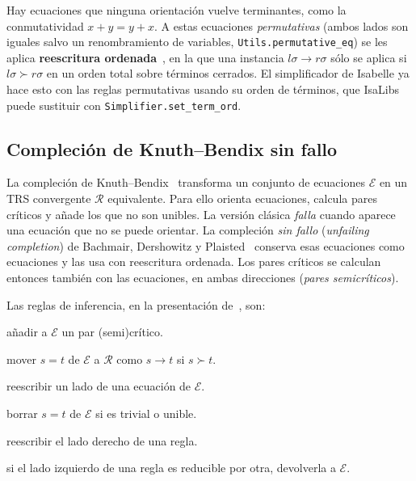 \documentclass[11pt,a4paper]{article}
\newcommand{\isa}[1]{\texttt{#1}}
\newcommand{\R}{\mathcal{R}}
\newcommand{\E}{\mathcal{E}}
\newcommand{\rw}{\rightarrow}
\theoremstyle{definition}
\theoremstyle{remark}
\begin{document}
Hay ecuaciones que ninguna orientación vuelve terminantes, como la conmutatividad
$x + y = y + x$. A estas ecuaciones \emph{permutativas} (ambos lados son iguales
salvo un renombramiento de variables, \isa{Utils.permutative\_eq}) se les aplica
\textbf{reescritura ordenada}~\cite{martin-nipkow}, en la que una instancia
$l\sigma \rw r\sigma$ sólo se aplica si $l\sigma \succ r\sigma$ en un orden total sobre términos cerrados.
El simplificador de Isabelle ya hace esto con las reglas permutativas usando su orden
de términos, que IsaLibs puede sustituir con \isa{Simplifier.set\_term\_ord}.

\subsection{Compleción de Knuth--Bendix sin fallo}
\label{sec:kb}

La compleción de Knuth--Bendix~\cite{knuth-bendix} transforma un conjunto de
ecuaciones $\E$ en un TRS convergente $\R$ equivalente. Para ello orienta ecuaciones,
calcula pares críticos y añade los que no son unibles. La versión clásica
\emph{falla} cuando aparece una ecuación que no se puede orientar. La compleción
\emph{sin fallo} (\emph{unfailing completion}) de Bachmair, Dershowitz y
Plaisted~\cite{bdp} conserva esas ecuaciones como ecuaciones y las usa con
reescritura ordenada. Los pares críticos se calculan entonces también con las
ecuaciones, en ambas direcciones (\emph{pares semicríticos}).

Las reglas de inferencia, en la presentación de~\cite{baader-nipkow}, son:
\begin{description}[nosep,font=\normalfont\itshape]
  \item[Deducir] añadir a $\E$ un par (semi)crítico.
  \item[Orientar] mover $s = t$ de $\E$ a $\R$ como $s \rw t$ si $s \succ t$.
  \item[Simplificar] reescribir un lado de una ecuación de $\E$.
  \item[Eliminar] borrar $s = t$ de $\E$ si es trivial o unible.
  \item[Componer] reescribir el lado derecho de una regla.
  \item[Colapsar] si el lado izquierdo de una regla es reducible por otra, devolverla a $\E$.
\end{description}
\end{document}
